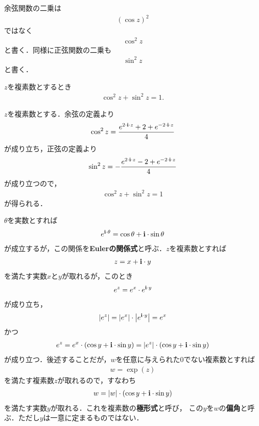 	余弦関数の二乗は
	\begin{align}
		(\cos{z})^2
	\end{align}
	ではなく
	\begin{align}
		\cos^2{z}
	\end{align}
	と書く．同様に正弦関数の二乗も
	\begin{align}
		\sin^2{z}
	\end{align}
	と書く．
	
	\begin{screen}
		\begin{thm}[余弦と正弦の二乗和は$1$]
			$z$を複素数とするとき
			\begin{align}
				\cos^2{z} + \sin^2{z} = 1.
			\end{align}
		\end{thm}
	\end{screen}
	
	\begin{sketch}
		$z$を複素数とする．余弦の定義より
		\begin{align}
			\cos^2{z} = \frac{e^{2 \cdot \mathbf{i} \cdot z} + 2 + e^{-2 \cdot \mathbf{i} \cdot z}}{4}
		\end{align}
		が成り立ち，正弦の定義より
		\begin{align}
			\sin^2{z} = -\frac{e^{2 \cdot \mathbf{i} \cdot z} - 2 + e^{-2 \cdot \mathbf{i} \cdot z}}{4}
		\end{align}
		が成り立つので，
		\begin{align}
			\cos^2{z} + \sin^2{z} = 1
		\end{align}
		が得られる．
		\QED
	\end{sketch}
	
	$\theta$を実数とすれば
	\begin{align}
		e^{\mathbf{i} \cdot \theta} = \cos{\theta} + \mathbf{i} \cdot \sin{\theta}
	\end{align}
	が成立するが，この関係を{\bf Eulerの関係式}と呼ぶ．$z$を複素数とすれば
	\begin{align}
		z = x + \mathbf{i} \cdot y
	\end{align}
	を満たす実数$x$と$y$が取れるが，このとき
	\begin{align}
		e^z = e^x \cdot e^{\mathbf{i} \cdot y}
	\end{align}
	が成り立ち，
	\begin{align}
		\left|e^z\right| = \left|e^x\right| \cdot \left|e^{\mathbf{i} \cdot y}\right| = e^x
	\end{align}
	かつ
	\begin{align}
		e^z = e^x \cdot (\cos{y} + \mathbf{i} \cdot \sin{y}) = \left|e^z\right| \cdot (\cos{y} + \mathbf{i} \cdot \sin{y})
	\end{align}
	が成り立つ．後述することだが，$w$を任意に与えられた$0$でない複素数とすれば
	\begin{align}
		w = \exp{(z)}
	\end{align}
	を満たす複素数$z$が取れるので，すなわち
	\begin{align}
		w = |w| \cdot (\cos{y} + \mathbf{i} \cdot \sin{y})
	\end{align}
	を満たす実数$y$が取れる．これを複素数の{\bf 極形式}と呼び，
	この$y$を$w$の{\bf 偏角}と呼ぶ．ただし$y$は一意に定まるものではない．
	